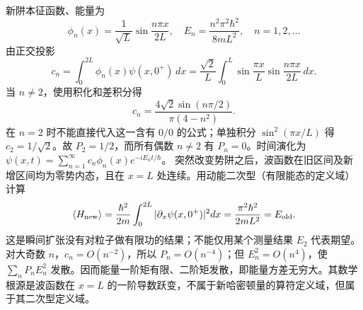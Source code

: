 新阱本征函数、能量为
\[\phi_n(x)=\frac1{\sqrt L}\sin\frac{n\pi x}{2L},\quad E_n=\frac{n^2\pi^2\hbar^2}{8mL^2},\quad n=1,2,\ldots\]
由正交投影
\[c_n=\int_0^{2L}\phi_n(x)\psi(x,0^+)\,dx=\frac{\sqrt2}{L}\int_0^L\sin\frac{\pi x}L\sin\frac{n\pi x}{2L}\,dx.\]
当 \(n\ne2\)，使用积化和差积分得
\[c_n=\frac{4\sqrt2\sin(n\pi/2)}{\pi(4-n^2)}.\]
在 \(n=2\) 时不能直接代入这一含有 \(0/0\) 的公式；单独积分 \(\sin^2(\pi x/L)\) 得 \(c_2=1/\sqrt2\)。故 \(P_2=1/2\)，而所有偶数 \(n\ne2\) 有 \(P_n=0\)。时间演化为 \(\psi(x,t)=\sum_{n=1}^\infty c_n\phi_n(x)e^{-iE_nt/\hbar}\)。
突然改变势阱之后，波函数在旧区间及新增区间均为零势内态，且在 \(x=L\) 处连续。用动能二次型（有限能态的定义域）计算
\[\langle H_{\rm new}\rangle=\frac{\hbar^2}{2m}\int_0^{2L}|\partial_x\psi(x,0^+)|^2dx=\frac{\pi^2\hbar^2}{2mL^2}=E_{\rm old}.\]
这是瞬间扩张没有对粒子做有限功的结果；不能仅用某个测量结果 \(E_2\) 代表期望。对大奇数 \(n\)，\(c_n=O(n^{-2})\)，所以 \(P_n=O(n^{-4})\)；但 \(E_n^2=O(n^4)\)，使 \(\sum_nP_n E_n^2\) 发散。因而能量一阶矩有限、二阶矩发散，即能量方差无穷大。其数学根源是波函数在 \(x=L\) 的一阶导数跃变，不属于新哈密顿量的算符定义域，但属于其二次型定义域。
